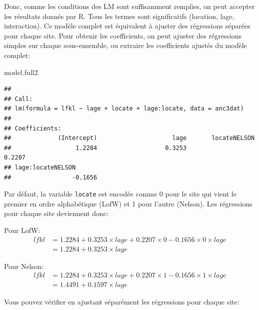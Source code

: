 \documentclass[
  12pt,
]{book}
\newenvironment{Shaded}{\begin{snugshade}}{\end{snugshade}}
\newcommand{\ControlFlowTok}[1]{\textcolor[rgb]{0.13,0.29,0.53}{\textbf{#1}}}
\newcommand{\DataTypeTok}[1]{\textcolor[rgb]{0.13,0.29,0.53}{#1}}
\newcommand{\KeywordTok}[1]{\textcolor[rgb]{0.13,0.29,0.53}{\textbf{#1}}}
\newcommand{\NormalTok}[1]{#1}
\newcommand{\OperatorTok}[1]{\textcolor[rgb]{0.81,0.36,0.00}{\textbf{#1}}}
\begin{document}
Donc, comme les conditions des LM sont suffisamment remplies, on peut accepter les résultats donnés par R. Tous les termes sont significatifs (location, lage, interaction). Ce modèle complet est équivalent à ajuster des régressions séparées pour chaque site. Pour obtenir les coefficients, on peut ajuster des régressions simples sur chaque sous-ensemble, ou extraire les coefficients ajustés du modèle complet:

\begin{Shaded}
\begin{Highlighting}[]
\NormalTok{model.full2}
\end{Highlighting}
\end{Shaded}

\begin{verbatim}
## 
## Call:
## lm(formula = lfkl ~ lage + locate + lage:locate, data = anc3dat)
## 
## Coefficients:
##             (Intercept)                     lage       locateNELSON        
##                  1.2284                   0.3253                   0.2207  
## lage:locateNELSON        
##                 -0.1656
\end{verbatim}

Par défaut, la variable \texttt{locate} est encodée comme 0 pour le site qui vient le premier en ordre alphabétique (LofW) et 1 pour l'autre (Nelson). Les régressions pour chaque site deviennent donc:

Pour LofW:
\[\begin{aligned}
lfkl &= 1.2284 + 0.3253 \times lage + 0.2207 \times 0 - 0.1656 \times 0 \times lage \\
 &= 1.2284 + 0.3253 \times lage
\end{aligned}\]

Pour Nelson:
\[\begin{aligned}
lfkl &= 1.2284 + 0.3253 \times lage + 0.2207 \times 1 - 0.1656 \times 1 \times lage \\
 &= 1.4491 + 0.1597 \times lage
\end{aligned}\]

Vous pouvez vérifier en ajustant séparément les régressions pour chaque site:

\begin{Shaded}
\end{Shaded}
\end{document}

